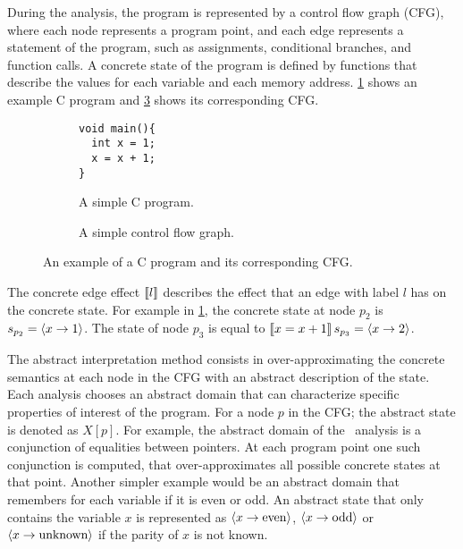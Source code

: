 During the analysis, the program is represented by a control flow graph (CFG), where each node represents a program point, and each edge represents a statement of the program,
such as assignments, conditional branches, and function calls.
A concrete state of the program is defined by functions that describe the values for each variable and each memory address.
\cref{fig:example-C-program} shows an example C program and \cref{fig:example-CFG} shows its corresponding CFG.

\begin{figure}\begin{subfigure}{0.45\textwidth}

    \begin{verbatim}
void main(){
  int x = 1;
  x = x + 1;
}
\end{verbatim}
    \caption{A simple C program.}\label{fig:example-C-program}
  \end{subfigure}
  \begin{subfigure}{0.45\textwidth}

    \caption{A simple control flow graph.}\label{fig:example-CFG}
  \end{subfigure}

  \caption{An example of a C program and its corresponding CFG.}


\end{figure}

The concrete edge effect $\llbracket l\rrbracket$ describes the effect that an edge with label $l$ has on the concrete state.
For example in \cref{fig:example-C-program}, the concrete state at node $p_2$ is $s_{p_2} = \langle x \rightarrow 1\rangle$.
The state of node $p_3$ is equal to $\llbracket x = x+1\rrbracket\,s_{p_3} = \langle x \rightarrow 2\rangle$.

The abstract interpretation method consists in over-approximating the concrete semantics at each node in the CFG with an abstract description of the state.
Each analysis chooses an abstract domain that can characterize specific properties of interest of the program.
For a node $p$ in the CFG; the abstract state is denoted as $X[p]$.
For example, the abstract domain of the \cpo\ analysis is a conjunction of equalities between pointers.
At each program point one such conjunction is computed, that over-approximates all possible concrete states at that point.
Another simpler example would be an abstract domain that remembers for each variable if it is even or odd.
An abstract state that only contains the variable $x$ is represented as $\langle x \rightarrow \text{even}\rangle$, $\langle x \rightarrow \text{odd}\rangle$ or $\langle x \rightarrow \text{unknown}\rangle$ if the parity of $x$ is not known.

